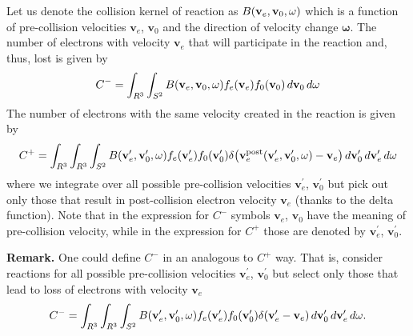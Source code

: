 \documentclass{article}
\newcommand{\diff}[1]{\, d#1}
\newcommand{\vect}[1]{\mathbf{#1}}
\newcommand{\of}[1]{\mleft( #1 \mright)}
\begin{document}
Let us denote the collision kernel of reaction as $B\of{\vect{v}_e, \vect{v}_0, \vect{\omega}}$ which is a function of pre-collision velocities $\vect{v}_e$, $\vect{v}_0$ and the direction of velocity change $\vect{\omega}$. The number of electrons with velocity $\vect{v}_e$ that will participate in the reaction and, thus, lost is given by 
\begin{align*}
C^- = \int_{R^3} \int_{S^2} B\of{\vect{v}_e, \vect{v}_0, \vect{\omega}} f_e\of{\vect{v}_e} f_0\of{\vect{v}_0} \diff{\vect{v}_0} \diff{\vect{\omega}}
\end{align*}
The number of electrons with the same velocity created in the reaction is given by
\begin{align*}
C^+ = \int_{R^3} \int_{R^3} \int_{S^2} 
B\of{\vect{v}_e^\prime, \vect{v}_0^\prime, \vect{\omega}} 
f_e\of{\vect{v}_e^\prime} f_0\of{\vect{v}_0^\prime} 
\delta\of{\vect{v}_e^\text{post}\of{\vect{v}_e^\prime, \vect{v}_0^\prime, \vect{\omega}} - \vect{v}_e} 
\diff{\vect{v}_0^\prime} \diff{\vect{v}_e^\prime} \diff{\vect{\omega}}
\end{align*}
where we integrate over all possible pre-collision velocities $\vect{v}_e^\prime$, $\vect{v}_0^\prime$ but pick out only those that result in post-collision electron velocity $\vect{v}_e$ (thanks to the delta function). Note that in the expression for $C^-$ symbols $\vect{v}_e$, $\vect{v}_0$ have the meaning of pre-collision velocity, while in the expression for $C^+$ those are denoted by $\vect{v}_e^\prime$, $\vect{v}_0^\prime$. 

\textbf{Remark.} One could define $C^-$ in an analogous to $C^+$ way. That is, consider reactions for all possible pre-collision velocities $\vect{v}_e^\prime$, $\vect{v}_0^\prime$ but select only those that lead to loss of electrons with velocity $\vect{v}_e$
\begin{align*}
C^- = \int_{R^3} \int_{R^3} \int_{S^2} 
B\of{\vect{v}_e^\prime, \vect{v}_0^\prime, \vect{\omega}} 
f_e\of{\vect{v}_e^\prime} f_0\of{\vect{v}_0^\prime} 
\delta\of{\vect{v}_e^\prime - \vect{v}_e} 
\diff{\vect{v}_0^\prime} \diff{\vect{v}_e^\prime} \diff{\vect{\omega}}.
\end{align*}
\end{document}
